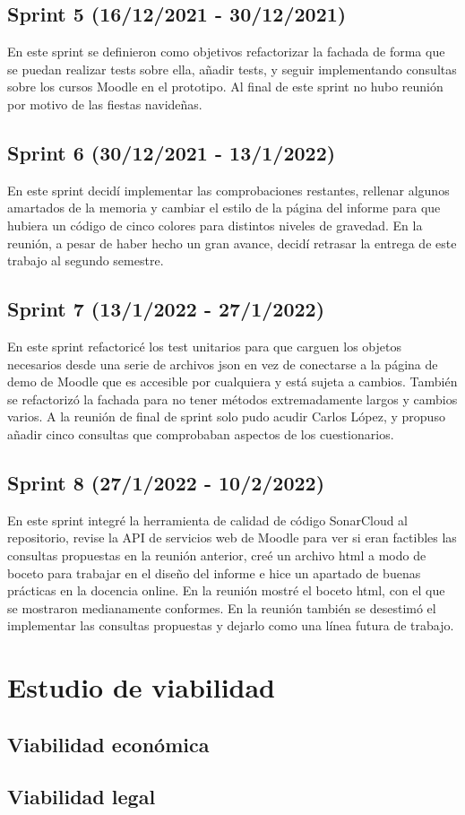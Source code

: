 \subsection{Sprint 5 (16/12/2021 - 30/12/2021)}
	En este sprint se definieron como objetivos refactorizar la fachada de forma que se puedan realizar tests sobre ella, añadir tests, y seguir implementando consultas sobre los cursos Moodle en el prototipo. Al final de este sprint no hubo reunión por motivo de las fiestas navideñas.
\subsection{Sprint 6 (30/12/2021 - 13/1/2022)}
	En este sprint decidí implementar las comprobaciones restantes, rellenar algunos amartados de la memoria y cambiar el estilo de la página del informe para que hubiera un código de cinco colores para distintos niveles de gravedad. En la reunión, a pesar de haber hecho un gran avance, decidí retrasar la entrega de este trabajo al segundo semestre.
\subsection{Sprint 7 (13/1/2022 - 27/1/2022)}
	En este sprint refactoricé los test unitarios para que carguen los objetos necesarios desde una serie de archivos json en vez de conectarse a la página de demo de Moodle que es accesible por cualquiera y está sujeta a cambios. También se refactorizó la fachada para no tener métodos extremadamente largos y cambios varios. A la reunión de final de sprint solo pudo acudir Carlos López, y propuso añadir cinco consultas que comprobaban aspectos de los cuestionarios.
\subsection{Sprint 8 (27/1/2022 - 10/2/2022)}
	En este sprint integré la herramienta de calidad de código SonarCloud al repositorio, revise la API de servicios web de Moodle para ver si eran factibles las consultas propuestas en la reunión anterior, creé un archivo html a modo de boceto para trabajar en el diseño del informe e hice un apartado de buenas prácticas en la docencia online. En la reunión mostré el boceto html, con el que se mostraron medianamente conformes. En la reunión también se desestimó el implementar las consultas propuestas y dejarlo como una línea futura de trabajo.



\section{Estudio de viabilidad}

\subsection{Viabilidad económica}

\subsection{Viabilidad legal}



